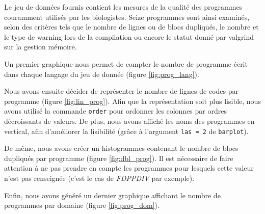 Le jeu de données fournis contient les mesures de la qualité des
programmes couramment utilisés par les biologistes. Seize programmes
sont ainsi examinés, selon des critères tels que le nombre de lignes ou
de blocs dupliqués, le nombre et le type de warning lors de la
compilation ou encore le statut donné par valgrind sur la gestion
mémoire.

Un premier graphique nous permet de compter le nombre de programme
écrit dans chaque langage du jeu de donnée (figure \ref{fig:prog_lang}).

Nous avons ensuite décider de représenter le nombre de lignes de codes
par programme (figure \ref{fig:lin_prog}). Afin que la représentation
soit plus lisible, nous avons utilisé la commande \lstinline{order}
pour ordonner les colonnes par ordres décroissants de valeurs. De
plus, nous avons affiché les noms des programmes en vertical, afin
d'améliorer la lisibilité (grâce à l'argument \lstinline{las = 2} de
\lstinline{barplot}).

De même, nous avons créer un histogrammes contenant le nombre de blocs
dupliqués par programme (figure \ref{fig:dbl_prog}). Il est nécessaire
de faire attention à ne pas prendre en compte les programmes pour
lesquels cette valeur n'est pas renseignée (c'est le cas de \emph{FDPPDIV}
par exemple).

Enfin, nous avons généré un dernier graphique affichant le nombre de
programmes par domaine (figure \ref{fig:prog_dom}).

